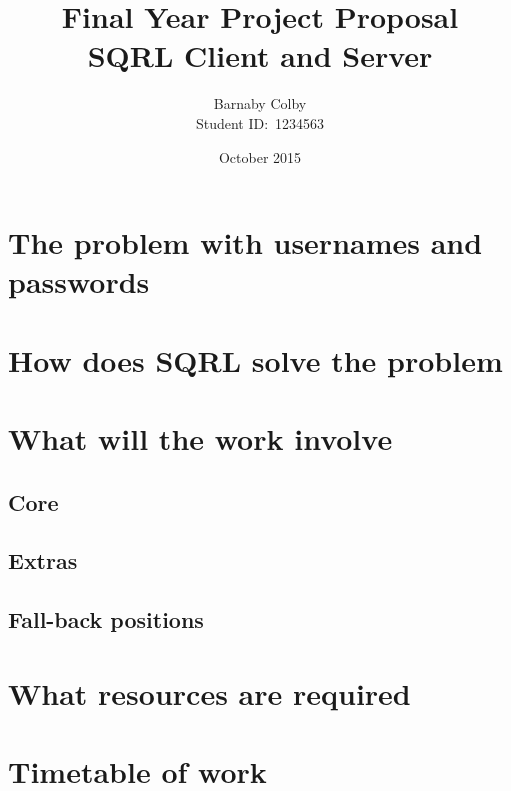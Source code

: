 \documentclass[a4paper]{article}
\begin{document}
\title{Final Year Project Proposal\\SQRL Client and Server}
\author{Barnaby Colby\\
Student ID:\ 1234563}
\date{October 2015}
\maketitle



\section*{The problem with usernames and passwords} 
\section*{How does SQRL solve the problem} 
\section*{What will the work involve}
    \subsection*{Core} 
    \subsection*{Extras}
    \subsection*{Fall-back positions}
\section*{What resources are required}
\section*{Timetable of work}
\end{document}
